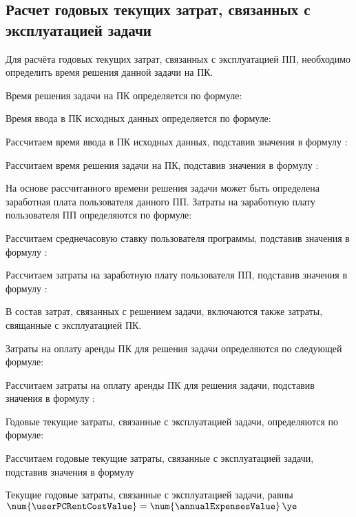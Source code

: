 \subsection{Расчет годовых текущих затрат, связанных с эксплуатацией задачи}
\label{sec:economics:manualTotalExpenses}

Для расчёта годовых текущих затрат, связанных с эксплуатацией ПП, необходимо определить время решения данной задачи на ПК.

Время решения задачи на ПК определяется по формуле:
\pcTaskAccomplishTimeCostEquation

Время ввода в ПК исходных данных определяется по формуле:
\manualInputTimeEquation

Рассчитаем время ввода в ПК исходных данных, подставив значения в формулу :
\manualInputTimeFormulaApplied

Рассчитаем время решения задачи на ПК, подставив значения в формулу :
\pcTaskAccomplishTimeCostFormulaApplied

На основе рассчитанного времени решения задачи может быть определена заработная плата пользователя данного ПП. Затраты на заработную плату пользователя ПП определяются по формуле:
\userSalaryEquation

Рассчитаем среднечасовую ставку пользователя программы, подставив значения в формулу :
\userRateFormulaApplied

Рассчитаем затраты на заработную плату пользователя ПП, подставив значения в формулу :
\userSalaryFormulaApplied

В состав затрат, связанных с решением задачи, включаются также затраты, свящанные с эксплуатацией ПК.

Затраты на оплату аренды ПК для решения задачи определяются по следующей формуле:
\userPCRentCostEquation

Рассчитаем затраты на оплату аренды ПК для решения задачи, подставив значения в формулу :
\userPCRentCostFormulaApplied

Годовые текущие затраты, связанные с эксплуатацией задачи, определяются по формуле:
\annualExpensesEquation

Рассчитаем годовые текущие затраты, связанные с эксплуатацией задачи, подставив значения в формулу 
\annualExpensesFormulaApplied

Текущие годовые затраты, связанные с эксплуатацией задачи, равны \(\num{\userPCRentCostValue} = \num{\annualExpensesValue} \, \ye\)